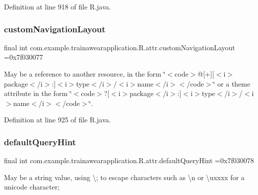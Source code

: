 Definition at line 918 of file R.\+java.

\mbox{\label{classcom_1_1example_1_1trainawearapplication_1_1_r_1_1attr_a9ff4e4df74a89300a537fc79d2e7ef70}} 
\subsubsection{\texorpdfstring{customNavigationLayout}{customNavigationLayout}}
{\footnotesize\ttfamily final int com.\+example.\+trainawearapplication.\+R.\+attr.\+custom\+Navigation\+Layout =0x7f030077\hspace{0.3cm}{\ttfamily [static]}}

May be a reference to another resource, in the form \char`\"{}$<$code$>$@\mbox{[}+\mbox{]}\mbox{[}$<$i$>$package$<$/i$>$\+:\mbox{]}$<$i$>$type$<$/i$>$/$<$i$>$name$<$/i$>$$<$/code$>$\char`\"{} or a theme attribute in the form \char`\"{}$<$code$>$?\mbox{[}$<$i$>$package$<$/i$>$\+:\mbox{]}$<$i$>$type$<$/i$>$/$<$i$>$name$<$/i$>$$<$/code$>$\char`\"{}. 

Definition at line 925 of file R.\+java.

\mbox{\label{classcom_1_1example_1_1trainawearapplication_1_1_r_1_1attr_a85be8c2bf5291b70d9e7c15720f61b75}} 
\subsubsection{\texorpdfstring{defaultQueryHint}{defaultQueryHint}}
{\footnotesize\ttfamily final int com.\+example.\+trainawearapplication.\+R.\+attr.\+default\+Query\+Hint =0x7f030078\hspace{0.3cm}{\ttfamily [static]}}

May be a string value, using \textquotesingle{}\textbackslash{};\textquotesingle{} to escape characters such as \textquotesingle{}\textbackslash{}n\textquotesingle{} or \textquotesingle{}\textbackslash{}uxxxx\textquotesingle{} for a unicode character; 

